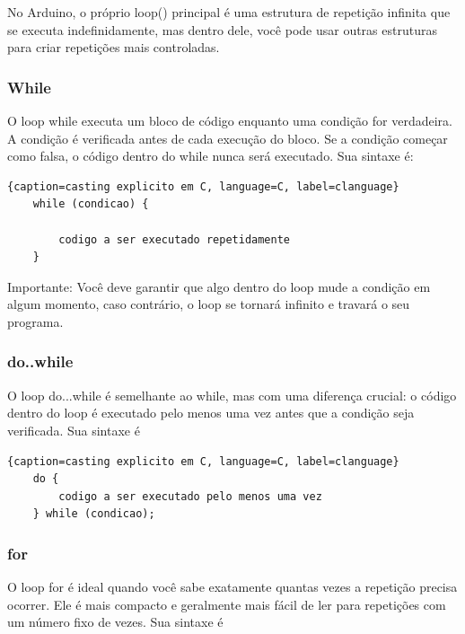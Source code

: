 \documentclass{report}
\begin{document}
	No Arduino, o próprio loop() principal é uma estrutura de repetição infinita que se executa indefinidamente, mas dentro dele, você pode usar outras estruturas para criar repetições mais controladas.
	
	\subsubsection{While}
	O loop while executa um bloco de código enquanto uma condição for verdadeira. A condição é verificada antes de cada execução do bloco. Se a condição começar como falsa, o código dentro do while nunca será executado. Sua sintaxe é:
	
	\begin{center}
		
		\begin{lstlisting}{caption=casting explicito em C, language=C, label=clanguage}	
	while (condicao) {
		
		codigo a ser executado repetidamente
	}
		\end{lstlisting}
	\end{center}
	
	Importante: Você deve garantir que algo dentro do loop mude a condição em algum momento, caso contrário, o loop se tornará infinito e travará o seu programa.
	
	\subsubsection{do..while}
	O loop do...while é semelhante ao while, mas com uma diferença crucial: o código dentro do loop é executado pelo menos uma vez antes que a condição seja verificada. Sua sintaxe é
	
	\begin{center}
		
		\begin{lstlisting}{caption=casting explicito em C, language=C, label=clanguage}	
	do {
		codigo a ser executado pelo menos uma vez
	} while (condicao);
		\end{lstlisting}
	\end{center}
	
	\subsubsection{for}
	O loop for é ideal quando você sabe exatamente quantas vezes a repetição precisa ocorrer. Ele é mais compacto e geralmente mais fácil de ler para repetições com um número fixo de vezes. Sua sintaxe é
	
\end{document}
